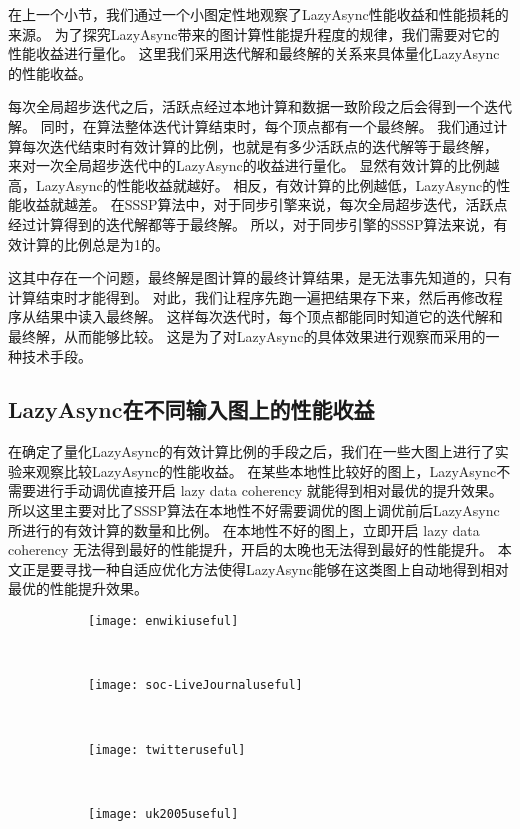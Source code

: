 在上一个小节，我们通过一个小图定性地观察了LazyAsync性能收益和性能损耗的来源。
为了探究LazyAsync带来的图计算性能提升程度的规律，我们需要对它的性能收益进行量化。
这里我们采用迭代解和最终解的关系来具体量化LazyAsync的性能收益。

每次全局超步迭代之后，活跃点经过本地计算和数据一致阶段之后会得到一个迭代解。
同时，在算法整体迭代计算结束时，每个顶点都有一个最终解。
我们通过计算每次迭代结束时有效计算的比例，也就是有多少活跃点的迭代解等于最终解，
来对一次全局超步迭代中的LazyAsync的收益进行量化。
显然有效计算的比例越高，LazyAsync的性能收益就越好。
相反，有效计算的比例越低，LazyAsync的性能收益就越差。
在SSSP算法中，对于同步引擎来说，每次全局超步迭代，活跃点经过计算得到的迭代解都等于最终解。
所以，对于同步引擎的SSSP算法来说，有效计算的比例总是为1的。


这其中存在一个问题，最终解是图计算的最终计算结果，是无法事先知道的，只有计算结束时才能得到。
对此，我们让程序先跑一遍把结果存下来，然后再修改程序从结果中读入最终解。
这样每次迭代时，每个顶点都能同时知道它的迭代解和最终解，从而能够比较。
这是为了对LazyAsync的具体效果进行观察而采用的一种技术手段。


\subsection{LazyAsync在不同输入图上的性能收益}

在确定了量化LazyAsync的有效计算比例的手段之后，我们在一些大图上进行了实验来观察比较LazyAsync的性能收益。
在某些本地性比较好的图上，LazyAsync不需要进行手动调优直接开启 lazy data coherency 就能得到相对最优的提升效果。
所以这里主要对比了SSSP算法在本地性不好需要调优的图上调优前后LazyAsync所进行的有效计算的数量和比例。
在本地性不好的图上，立即开启 lazy data coherency 无法得到最好的性能提升，开启的太晚也无法得到最好的性能提升。
本文正是要寻找一种自适应优化方法使得LazyAsync能够在这类图上自动地得到相对最优的性能提升效果。

\begin{figure}[!htbp]
  \centering
  \begin{subfigure}[b]{0.4\textwidth}
    \texttt{[image: enwikiuseful]}
    \caption{}
  \end{subfigure}%
  ~%
  \begin{subfigure}[b]{0.4\textwidth}
    \texttt{[image: soc-LiveJournaluseful]}
    \caption{}
  \end{subfigure}
  \\%
  \begin{subfigure}[b]{0.4\textwidth}
    \texttt{[image: twitteruseful]}
    \caption{}
  \end{subfigure}%
  ~%
  \begin{subfigure}[b]{0.4\textwidth}
    \texttt{[image: uk2005useful]}
    \caption{}
  \end{subfigure}
  \label{fig:useful}
\end{figure}


